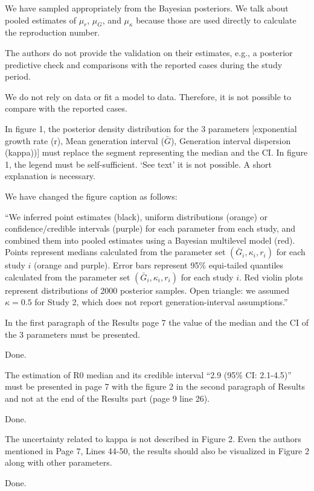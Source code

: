 \documentclass[12pt]{article}
\newcommand{\revtext}{\textsf}
\begin{document}
We have sampled appropriately from the Bayesian posteriors. We talk about pooled estimates of $\mu_r$, $\mu_G$, and $\mu_\kappa$ because those are used directly to calculate the reproduction number.

\revtext{The authors do not provide the validation on their estimates, e.g., a posterior predictive check
and comparisons with the reported cases during the study period.}

We do not rely on data or fit a model to data. Therefore, it is not possible to compare with the reported cases.

\revtext{In figure 1, the posterior density distribution for the 3 parameters [exponential growth rate (r),
Mean generation interval ($\bar G$), Generation interval dispersion (kappa))] must replace the
segment representing the median and the CI. In figure 1, the legend must be self-sufficient. ‘See
text’ it is not possible. A short explanation is necessary.}

We have changed the figure caption as follows:

``We inferred point estimates (black), uniform distributions (orange) or confidence/credible intervals (purple) for each parameter from each study, and combined them into pooled estimates using a Bayesian multilevel model (red).
Points represent medians calculated from the parameter set $(\bar{G}_{i}, \kappa_{i}, r_{i})$ for each study $i$ (orange and purple).
Error bars represent 95\% equi-tailed quantiles calculated from the parameter set $(\bar{G}_{i}, \kappa_{i}, r_{i})$ for each study $i$.
Red violin plots represent distributions of 2000 posterior samples.
Open triangle: we assumed $\kappa=0.5$ for Study 2, which does not report generation-interval assumptions.''

\revtext{In the first paragraph of the Results page 7 the value of the median and the CI of the 3
parameters must be presented.}

Done.

\revtext{The estimation of R0 median and its credible interval “2.9 (95\% CI: 2.1-4.5)” must be presented
in page 7 with the figure 2 in the second paragraph of Results and not at the end of the Results
part (page 9 line 26).}

Done.

\revtext{The uncertainty related to kappa is not described in Figure 2. Even the authors mentioned in
Page 7, Lines 44-50, the results should also be visualized in Figure 2 along with other
parameters.}

Done.
\end{document}
